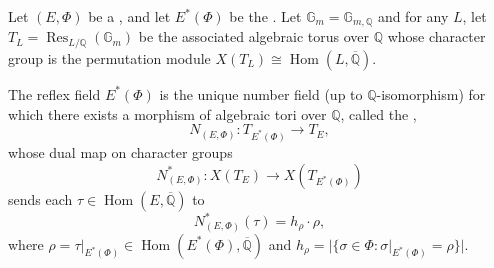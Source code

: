 \begin{proposition} \label{proposition:reflex_field_characterization_via_tori_and_reflex_norm}
    Let $(E, \Phi)$ be a , and let $E^*(\Phi)$ be the . Let $\mathbb{G}_m = \mathbb{G}_{m,\mathbb{Q}}$ and for any  $L$, let $T_L = \operatorname{Res}_{L/\mathbb{Q}}(\mathbb{G}_m)$ be the associated algebraic torus over $\mathbb{Q}$ whose character group is the permutation module $X(T_L) \cong \operatorname{Hom}(L, \overline{\mathbb{Q}})$.

    The reflex field $E^*(\Phi)$ is the unique number field (up to $\mathbb{Q}$-isomorphism) for which there exists a morphism of algebraic tori over $\mathbb{Q}$, called the ,
    $$N_{(E,\Phi)}: T_{E^*(\Phi)} \to T_E,$$
    whose dual map on character groups
    $$N_{(E,\Phi)}^*: X(T_E) \to X(T_{E^*(\Phi)})$$
    sends each $\tau \in \operatorname{Hom}(E, \overline{\mathbb{Q}})$ to
    $$N_{(E,\Phi)}^*(\tau) = h_\rho \cdot \rho,$$
    where $\rho = \tau|_{E^*(\Phi)} \in \operatorname{Hom}(E^*(\Phi), \overline{\mathbb{Q}})$ and $h_\rho = |\{\sigma \in \Phi : \sigma|_{E^*(\Phi)} = \rho\}|$.
\end{proposition}
